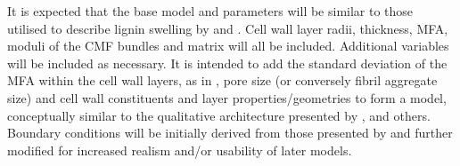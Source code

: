 It is expected that the base model and parameters will be similar to those
utilised to describe lignin swelling by \citet{Alm_ras_2005} and \citet{Yamamoto_1998}. Cell wall layer radii, thickness, MFA, moduli of the CMF bundles and matrix will all be included. Additional variables will be included
as necessary. It is intended to add the standard deviation of the MFA within the
cell wall layers, as in \citet{Harrington_1998}, pore size (or conversely fibril
aggregate size) \citep{Fahl_n_2005,Chang_2014,BIORESBioRes_07_1_0521_Salmen_OSSR_Struc_Organis_Wood_Polymers,Kim_2011} and cell wall
constituents \citep{Baba_2009,Donaldson_2001} and layer properties/geometries
\cite{Bergander_2002,grozdits1984differentiation,Alm_ras_2005,Yamamoto_1998,Chang_2014,ISI:A1995QJ03000001} to form a model, conceptually similar to the qualitative
architecture presented by \citet{Mellerowicz_2011}, \citet{Salm_n_2009} and others. Boundary conditions will be initially derived from those
presented by \citet{Alm_ras_2005} and further modified for increased realism
and/or usability of later models.